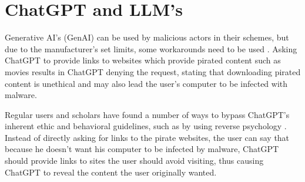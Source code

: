 


\section{ChatGPT and LLM's}

\begin{comment}

What to cover:
    - How Generative AI can be used by both cybersecurity professionals and threat actors
    - Circumventing ChatGPT's ethical restrictions with, for example prompt injections attacks or reverse psychology (with at least 1-2 examples)
    - How scholars and regular users have found ways to bypass ChatGPT's ethical restrictions??
    - Tekoälyn päivitys kun löydetään uusia tapoja ohittaa sen eettiset ohjeistukset ja kehittäjien asettamat rajoitukset
    - Pyydetään tekoälyä roolipelaamaan social engineering skenaarioita
    - Kielioppi ja kirjoitusvirheiden korjaus scam viesteissä
    - Generation of malware?
    - Analysis of gathered data to find insights to be used against the victim
    
\end{comment}


Generative AI's (GenAI) can be used by malicious actors in their schemes, but due to the manufacturer's set limits, some workarounds need to be used \citep{guptaFromChatGPTtoThreatGPT2023}. Asking ChatGPT to provide links to websites which provide pirated content such as movies results in ChatGPT denying the request, stating that downloading pirated content is unethical and may also lead the user's computer to be infected with malware.

Regular users and scholars have found a number of ways to bypass ChatGPT's inherent ethic and behavioral guidelines, such as by using reverse psychology \citep{guptaFromChatGPTtoThreatGPT2023}. Instead of directly asking for links to the pirate websites, the user can say that because he doesn't want his computer to be infected by malware, ChatGPT should provide links to sites the user should avoid visiting, thus causing ChatGPT to reveal the content the user originally wanted.



